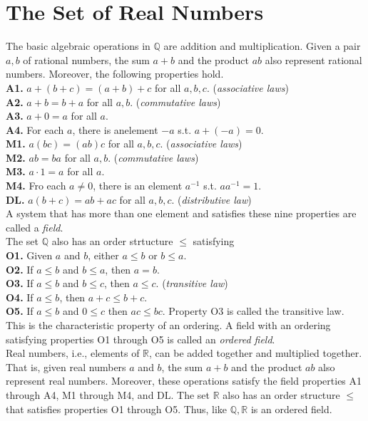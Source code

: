 \documentclass{book}
\theoremstyle{definition}
\begin{document}
\section{The Set of Real Numbers}
The basic algebraic operations in $\mathbb{Q}$ are addition and multiplication. Given a pair $a,b$ of rational numbers, the sum $a+b$ and the product $ab$ also represent rational numbers. Moreover, the following properties hold.
\\ \textbf{A1.} $a+(b+c)=(a+b)+c$ for all $a,b,c$. (\textit{associative laws})
\\ \textbf{A2.} $a+b=b+a$ for all $a,b$. (\textit{commutative laws})
\\ \textbf{A3.} $a+0=a$ for all $a$.
\\ \textbf{A4.} For each $a$, there is anelement $-a$ s.t. $a+(-a)=0$.
\\ \textbf{M1.} $a(bc)=(ab)c$ for all $a,b,c$. (\textit{associative laws})
\\ \textbf{M2.} $ab = ba$ for all $a,b$. (\textit{commutative laws})
\\ \textbf{M3.} $a \cdot 1 = a $ for all $a$.
\\ \textbf{M4.} Fro each $a \neq 0$, there is an element $a^{-1}$ s.t. $aa^{-1}=1$.
\\ \textbf{DL.} $a(b+c)=ab+ac$ for all $a,b,c$. (\textit{distributive law})
\\ A system that has more than one element and satisfies these nine properties are called a \textit{field}.
\\ The set $\mathbb{Q}$ also has an order strtucture $\leq$ satisfying
\\ \textbf{O1.} Given $a$ and $b$, either $a \leq b$ or $b \leq a$.
\\ \textbf{O2.} If $a \leq b$ and $b \leq a$, then $a=b$.
\\ \textbf{O3.} If $a \leq b$ and $b \leq c$, then $a \leq c$. (\textit{transitive law})
\\ \textbf{O4.} If $a \leq b$, then $a+c \leq b+c$.
\\ \textbf{O5.} If $a \leq b$ and $0 \leq c$ then $ac \leq bc$.
Property O3 is called the transitive law. This is the characteristic property of an ordering. A field with an ordering satisfying properties O1 through O5 is called an \textit{ordered field}.
\\ Real numbers, i.e., elements of $\mathbb{R}$, can be added together and multiplied together. That is, given real numbers $a$ and $b$, the sum $a+b$ and the product $ab$ also represent real numbers. Moreover, these operations satisfy the field properties A1 through A4, M1 through M4, and DL. The set $\mathbb{R}$ also has an order structure $\leq$ that satisfies properties O1 through O5. Thus, like $\mathbb{Q}, \mathbb{R}$ is an ordered field.
\end{document}
